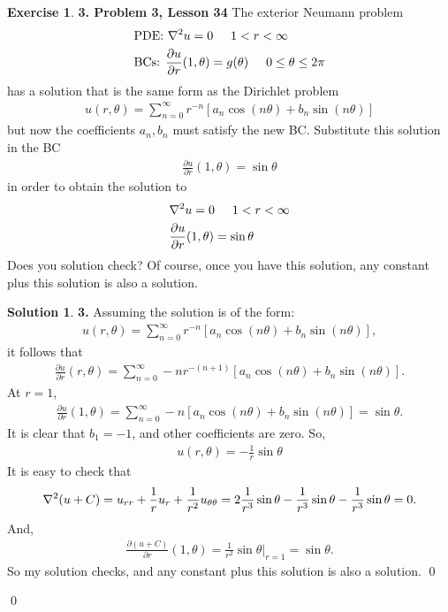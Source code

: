 \documentclass{book}
\theoremstyle{definition}
\newtheorem*{exer*}{Exercise}
\newtheorem*{sln*}{Solution}
\newcommand{\p}{\partial}
\newcommand{\f}[2]{\frac{#1}{#2}}
\newcommand{\lb}{\left[}
\newcommand{\rb}{\right]}
\begin{document}
\begin{exer*}\textbf{3. Problem 3, Lesson 34} 
	The exterior Neumann problem 
	\begin{align*}
	&\text{PDE: } \laplacian u = 0\hspace{0.5cm} 1 < r < \infty\\
	&\text{BCs: } \f{\p u}{\p r}(1,\theta) = g(\theta) \hspace{0.5cm} 0 \leq \theta \leq 2\pi
	\end{align*}
	has a solution that is the same form as the Dirichlet problem 
	\begin{align*}
	u(r,\theta) = \sum^\infty_{n=0} r^{-n}
	\lb a_n\cos(n\theta) + b_n\sin(n\theta) \rb
	\end{align*}
	but now the coefficients $a_n, b_n$ must satisfy the new BC. Substitute this solution in the BC
	\begin{align*}
	\f{\p u}{\p r}(1,\theta) = \sin\theta
	\end{align*}
	in order to obtain the solution to 
	\begin{align*}
	&\laplacian u = 0 \hspace{0.5cm} 1 < r < \infty\\
	&\f{\p u}{\p r}(1,\theta) = \sin\theta
	\end{align*}
	Does you solution check? Of course, once you have this solution, any constant plus this solution is also a solution. 
	
	\begin{sln*}\textbf{3. }
		Assuming the solution is of the form:
		\begin{align*}
		u(r,\theta) = \sum^\infty_{n=0} r^{-n}
		\lb a_n\cos(n\theta) + b_n\sin(n\theta) \rb,
		\end{align*}
		it follows that
		\begin{align*}
		\f{\p u}{\p r}(r,\theta) = \sum^\infty_{n=0} -n r^{-(n+1)}
		\lb a_n\cos(n\theta) + b_n\sin(n\theta) \rb.
		\end{align*}
		At $r=1$,
		\begin{align*}
		\f{\p u}{\p r}(1,\theta) = \sum^\infty_{n=0} -n
		\lb a_n\cos(n\theta) + b_n\sin(n\theta) \rb = \sin \theta.
		\end{align*}
		It is clear that $b_1 = -1$, and other coefficients are zero. So,
		\begin{align*}
		\boxed{u(r,\theta) = -\f{1}{r}\sin\theta}
		\end{align*}
		It is easy to check that
		\begin{align*}
		\laplacian (u+C) = u_{rr} + \f{1}{r}u_r + \f{1}{r^2}u_{\theta\theta} = 2\f{1}{r^3}\sin\theta - \f{1}{r^3}\sin\theta - \f{1}{r^3}\sin\theta = 0.
		\end{align*}
		And,
		\begin{align*}
		\f{\p (u+C)}{\p r}(1,\theta) = \f{1}{r^2}\sin\theta\bigg\vert_{r=1} = \sin\theta.
		\end{align*}
		So my solution checks, and any constant plus this solution is also a solution. \qed
	\end{sln*}\qed
\end{exer*}
\newpage
\end{document}
